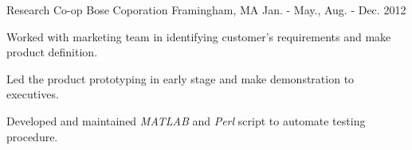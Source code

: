 \begin{cventries}
	\cventry
		{Research Co-op} %
		{Bose Coporation} %
		{Framingham, MA} %
		{Jan. - May., Aug. - Dec. 2012} %
		{
			\begin{cvitems} %
				\item {Worked with marketing team in identifying customer's requirements and make product definition.}
				\item {Led the product prototyping in early stage and make demonstration to executives.}
				\item {Developed and maintained \textit{MATLAB} and \textit{Perl} script to automate testing procedure.}
			\end{cvitems}
		}

\end{cventries}
